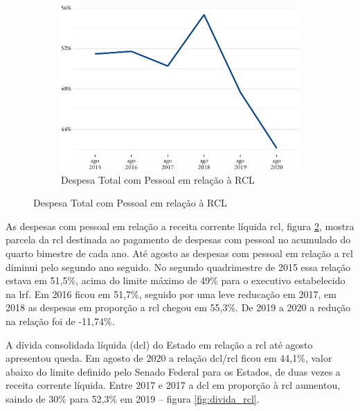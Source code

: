 \begin{figure}[!h]
\begin{subfigure}{\linewidth}
		\caption{\label{fig:desp_pessoal_rcl}Despesa Total com Pessoal em relação à RCL}
		\includegraphics{fig/desp_pessoal_rcl-1.pdf}
	\end{subfigure}
\end{figure}

As despesas com pessoal em relação a receita corrente líquida
\acrshort{rcl}, figura \ref{fig:desp_pessoal_rcl}, mostra parcela da
\acrshort{rcl} destinada ao pagamento de despesas com pessoal no
acumulado do quarto bimestre de cada ano. Até agosto as despesas com
pessoal em relação a \acrshort{rcl} diminui pelo segundo ano seguido. No
segundo quadrimestre de 2015 essa relação estava em 51,5\%, acima do
limite máximo de 49\% para o executivo estabelecido na \acrshort{lrf}.
Em 2016 ficou em 51,7\%, seguido por uma leve reducação em 2017, em 2018
as despesas em proporção a \acrshort{rcl} chegou em 55,3\%. De 2019 a
2020 a redução na relação foi de -11,74\%.

A dívida consolidada líquida (\acrshort{dcl}) do Estado em relação a
\acrshort{rcl} até agosto apresentou queda. Em agosto de 2020 a relação
\acrshort{dcl}/\acrshort{rcl} ficou em 44,1\%, valor abaixo do limite
definido pelo Senado Federal para os Estados, de duas vezes a receita
corrente líquida. Entre 2017 e 2017 a \acrshort{dcl} em proporção à
\acrshort{rcl} aumentou, saindo de 30\% para 52,3\% em 2019 -- figura
\ref{fig:divida_rcl}.

